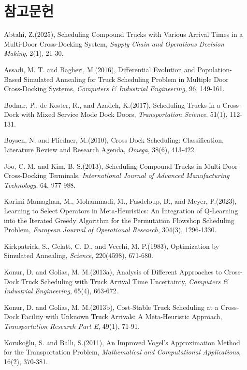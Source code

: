 \documentclass[10pt,a4paper]{article}
\begin{document}
\section*{참고문헌}
\begin{description}\small
\item Abtahi, Z.(2025), Scheduling Compound Trucks with Various Arrival Times in a Multi-Door Cross-Docking System, \emph{Supply Chain and Operations Decision Making}, 2(1), 21-30.
\item Assadi, M. T. and Bagheri, M.(2016), Differential Evolution and Population-Based Simulated Annealing for Truck Scheduling Problem in Multiple Door Cross-Docking Systems, \emph{Computers \& Industrial Engineering}, 96, 149-161.
\item Bodnar, P., de Koster, R., and Azadeh, K.(2017), Scheduling Trucks in a Cross-Dock with Mixed Service Mode Dock Doors, \emph{Transportation Science}, 51(1), 112-131.
\item Boysen, N. and Fliedner, M.(2010), Cross Dock Scheduling: Classification, Literature Review and Research Agenda, \emph{Omega}, 38(6), 413-422.
\item Joo, C. M. and Kim, B. S.(2013), Scheduling Compound Trucks in Multi-Door Cross-Docking Terminals, \emph{International Journal of Advanced Manufacturing Technology}, 64, 977-988.
\item Karimi-Mamaghan, M., Mohammadi, M., Pasdeloup, B., and Meyer, P.(2023), Learning to Select Operators in Meta-Heuristics: An Integration of Q-Learning into the Iterated Greedy Algorithm for the Permutation Flowshop Scheduling Problem, \emph{European Journal of Operational Research}, 304(3), 1296-1330.
\item Kirkpatrick, S., Gelatt, C. D., and Vecchi, M. P.(1983), Optimization by Simulated Annealing, \emph{Science}, 220(4598), 671-680.
\item Konur, D. and Golias, M. M.(2013a), Analysis of Different Approaches to Cross-Dock Truck Scheduling with Truck Arrival Time Uncertainty, \emph{Computers \& Industrial Engineering}, 65(4), 663-672.
\item Konur, D. and Golias, M. M.(2013b), Cost-Stable Truck Scheduling at a Cross-Dock Facility with Unknown Truck Arrivals: A Meta-Heuristic Approach, \emph{Transportation Research Part E}, 49(1), 71-91.
\item Korukoğlu, S. and Ballı, S.(2011), An Improved Vogel's Approximation Method for the Transportation Problem, \emph{Mathematical and Computational Applications}, 16(2), 370-381.

\end{description}
\end{document}
